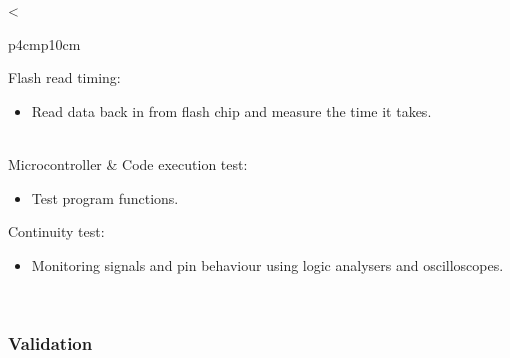 \begin{longtable}{<{\raggedright}p{4cm}p{10cm}}
\begin{itemize}
  \end{itemize}
 Flash read timing: 
  \begin{itemize}
    \item Read data back in from flash chip and measure the time it takes.
  \end{itemize} \\
Microcontroller & Code execution test:  
  \begin{itemize}
    \item Test program functions. 
  \end{itemize} 
 Continuity test:  
 \begin{itemize}
  \item Monitoring signals and pin behaviour using logic analysers and oscilloscopes.
 \end{itemize}\\
 \bottomrule
\end{longtable}

\subsubsection{Validation}

